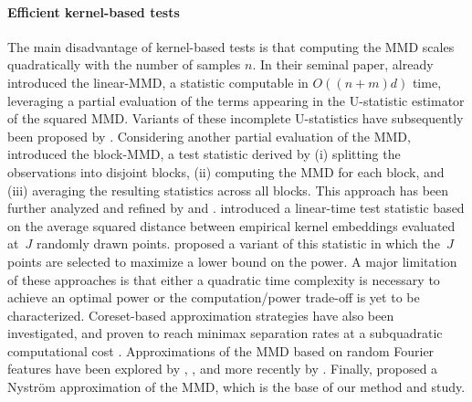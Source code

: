 \paragraph{Efficient kernel-based tests}
The main disadvantage of kernel-based tests is that computing the MMD scales quadratically with the number of samples $n$.
In their seminal paper,  already introduced the linear-MMD, a statistic computable in $O((n+m)d)$ time, leveraging a partial evaluation of the terms appearing in the U-statistic estimator of the squared MMD. 
Variants of these incomplete U-statistics have subsequently been proposed by . 
Considering another partial evaluation of the MMD,  introduced the block-MMD, a test statistic derived by (i) splitting the observations into disjoint blocks, (ii) computing the MMD for each block, and (iii) averaging the resulting statistics across all blocks. This approach has been further analyzed and refined by  and .
 introduced a linear-time test statistic based on the average squared distance between empirical kernel embeddings evaluated at~$J$ randomly drawn points.  proposed a variant of this statistic in which the~$J$ points are selected to maximize a lower bound on the power.
A major limitation of these approaches is that either a quadratic time complexity is necessary to achieve an optimal power  or the computation/power trade-off is yet to be characterized.
Coreset-based approximation strategies have also been investigated, and proven to reach minimax separation rates at a subquadratic computational cost . 
Approximations of the MMD based on random Fourier features have been explored by , , and more recently by . 
Finally,  proposed a Nyström approximation of the MMD,
which is the base of our method and study. 


